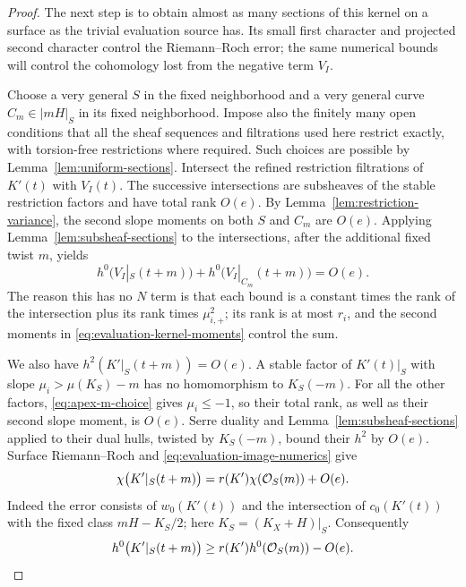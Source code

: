 \begin{proof}
The next step is to obtain almost as many sections of this kernel
on a surface as the trivial evaluation source has.  Its small
first character and projected second character control the Riemann--Roch error;
the same numerical bounds will control the cohomology lost from
the negative term $V_I$.

Choose a very general $S$ in the fixed neighborhood and a very
general curve $C_m\in|mH|_S$ in its fixed neighborhood.
Impose also the finitely many open conditions that all the sheaf
sequences and filtrations used here restrict exactly, with
torsion-free restrictions where required.  Such choices are
possible by Lemma~\ref{lem:uniform-sections}.  Intersect the
refined restriction filtrations of $K'(t)$ with $V_I(t)$.
The successive intersections are subsheaves of the stable
restriction factors and have total rank $O(e)$.  By
Lemma~\ref{lem:restriction-variance}, the second slope moments
on both $S$ and $C_m$ are $O(e)$.  Applying
Lemma~\ref{lem:subsheaf-sections} to the intersections, after the
additional fixed twist $m$, yields
\begin{equation}\label{eq:evaluation-negative-sections}
 h^0\bigl(V_I|_S(t+m)\bigr)+
 h^0\bigl(V_I|_{C_m}(t+m)\bigr)=O(e).
\end{equation}
The reason this has no $N$ term is that each bound is a constant
times the rank of the intersection plus its rank times
$\mu_{i,+}^2$; its rank is at most $r_i$, and the second moments
in \eqref{eq:evaluation-kernel-moments} control the sum.

We also have $h^2(K'|_S(t+m))=O(e)$.  A stable factor of $K'(t)|_S$
with slope $\mu_i>\mu(K_S)-m$ has no homomorphism to $K_S(-m)$.
For all the other factors, \eqref{eq:apex-m-choice} gives
$\mu_i\leq-1$, so their total rank, as well as their second slope
moment, is $O(e)$.  Serre duality and
Lemma~\ref{lem:subsheaf-sections} applied to their dual hulls,
twisted by $K_S(-m)$, bound their $h^2$ by $O(e)$.
Surface Riemann--Roch and
\eqref{eq:evaluation-image-numerics} give
\[
 \chi\bigl(K'|_S(t+m)\bigr)
 =r(K')\chi(\mathcal O_S(m))+O(e).
\]
Indeed the error consists of $w_0(K'(t))$ and the intersection of
$c_0(K'(t))$ with the fixed class $mH-K_S/2$; here
$K_S=(K_X+H)|_S$.  Consequently
\begin{equation}\label{eq:kernel-many-sections}
 h^0\bigl(K'|_S(t+m)\bigr)
 \geq r(K')h^0(\mathcal O_S(m))-O(e).
\end{equation}


\end{proof}
